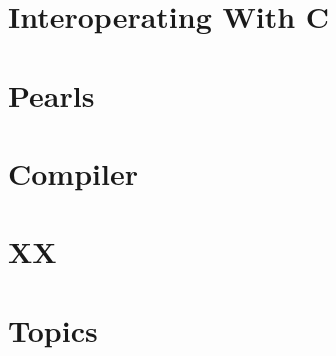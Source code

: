\documentclass[svgnames,12pt,a4paper]{book}
\begin{document}
\chapter{Interoperating With C}
\label{sec:inter-with-c}


\chapter{Pearls}



\chapter{Compiler}







\chapter{XX}


\chapter{Topics}




\end{document}
